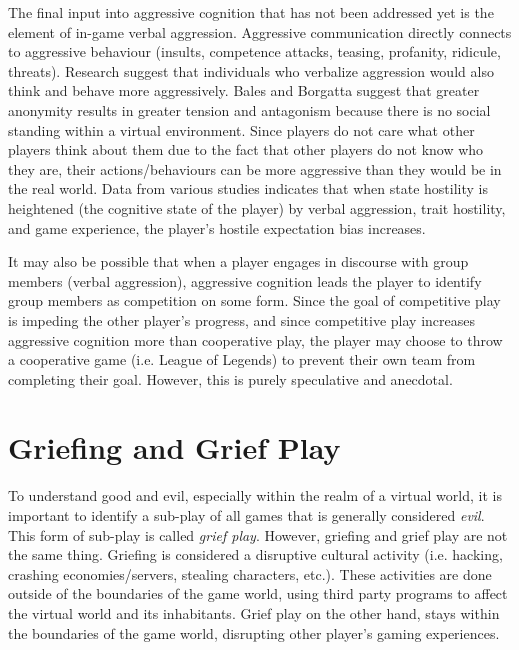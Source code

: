 \documentclass[12pt]{report}
\begin{document}
The final input into aggressive cognition that has not been addressed yet is the element of in-game verbal aggression. Aggressive communication directly connects to aggressive behaviour (insults, competence attacks, teasing, profanity, ridicule, threats). Research suggest that individuals who verbalize aggression would also think and behave more aggressively.\cite{Hostile_expectations} Bales and Borgatta suggest that greater anonymity results in greater tension and antagonism because there is no social standing within a virtual environment. Since players do not care what other players think about them due to the fact that other players do not know who they are, their actions/behaviours can be more aggressive than they would be in the real world. Data from various studies indicates that when state hostility is heightened (the cognitive state of the player) by verbal aggression, trait hostility, and game experience, the player's hostile expectation bias increases.

It may also be possible that when a player engages in discourse with group members (verbal aggression), aggressive cognition leads the player to identify group members as competition on some form. Since the goal of competitive play is impeding the other player's progress, and since competitive play increases aggressive cognition more than cooperative play, the player may choose to throw a cooperative game (i.e. League of Legends) to prevent their own team from completing their goal. However, this is purely speculative and anecdotal.

\section{Griefing and Grief Play}
To understand good and evil, especially within the realm of a virtual world, it is important to identify a sub-play of all games that is generally considered \textit{evil}. This form of sub-play is called \textit{grief play}. However, griefing and grief play are not the same thing. Griefing is considered a disruptive cultural activity (i.e. hacking, crashing economies/servers, stealing characters, etc.). These activities are done outside of the boundaries of the game world, using third party programs to affect the virtual world and its inhabitants. Grief play on the other hand, stays within the boundaries of the game world, disrupting other player's gaming experiences.\cite{Goon_culture}
\end{document}

